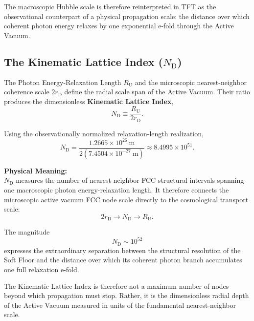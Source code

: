 The macroscopic Hubble scale is therefore reinterpreted in TFT as the observational counterpart of a physical propagation scale: the distance over which coherent photon energy relaxes by one exponential e-fold through the Active Vacuum.

\subsection{The Kinematic Lattice Index ($N_{\mathrm D}$)}

The Photon Energy-Relaxation Length $R_{\mathrm U}$ and the microscopic nearest-neighbor coherence scale $2r_{\mathrm D}$ define the radial scale span of the Active Vacuum. Their ratio produces the dimensionless \textbf{Kinematic Lattice Index},
\begin{equation}
    N_{\mathrm D}
    \equiv
    \frac{R_{\mathrm U}}
    {2r_{\mathrm D}}.
\end{equation}

Using the observationally normalized relaxation-length realization,
\begin{equation}
    N_{\mathrm D}
    =
    \frac{
        1.2665\times10^{26}\ \mathrm{m}
    }{
        2\left(
            7.4504\times10^{-27}\ \mathrm{m}
        \right)
    }
    \approx
    8.4995\times10^{51}.
\end{equation}

\vspace{0.5em}
\noindent\textbf{Physical Meaning:}\\

$N_{\mathrm D}$ measures the number of nearest-neighbor FCC structural intervals spanning one macroscopic photon energy-relaxation length. It therefore connects the microscopic active vacuum FCC node scale directly to the cosmological transport scale:
\begin{equation}
    2r_{\mathrm D}
    \longrightarrow
    N_{\mathrm D}
    \longrightarrow
    R_{\mathrm U}.
\end{equation}

The magnitude
\begin{equation}
    N_{\mathrm D}
    \sim
    10^{52}
\end{equation}
expresses the extraordinary separation between the structural resolution of the Soft Floor and the distance over which its coherent photon branch accumulates one full relaxation e-fold.

The Kinematic Lattice Index is therefore not a maximum number of nodes beyond which propagation must stop. Rather, it is the dimensionless radial depth of the Active Vacuum measured in units of the fundamental nearest-neighbor scale.


